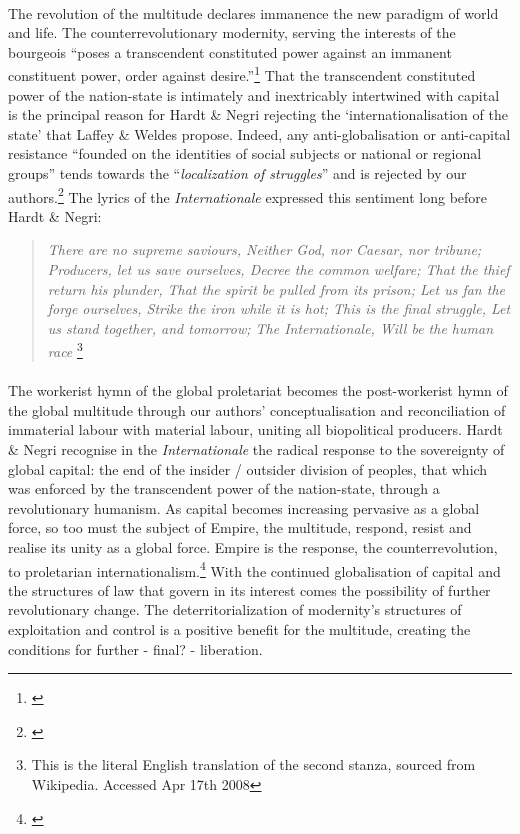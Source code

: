 \documentclass[12pt,a4paper,titlepage]{article}
\begin{document}
\paragraph{}The revolution of the multitude declares immanence the new paradigm of world and life. The counterrevolutionary modernity, serving the interests of the bourgeois ``poses a transcendent constituted power against an immanent constituent power, order against desire.''\footnote{\cite[p. 74]{Hardt:2001jl}} That the transcendent constituted power of the nation-state is intimately and inextricably intertwined with capital is the principal reason for Hardt \& Negri rejecting the `internationalisation of the state' that Laffey \& Weldes propose. Indeed, any anti-globalisation or anti-capital resistance ``founded on the identities of social subjects or national or regional groups'' tends towards the ``\textit{localization of struggles}'' and is rejected by our authors.\footnote{\cite[p. 44, original emphasis]{Hardt:2001jl}} The lyrics of the \textit{Internationale} expressed this sentiment long before Hardt \& Negri:

\begin{quote}
\textit{There are no supreme saviours, Neither God, nor Caesar, nor tribune; Producers, let us save ourselves, Decree the common welfare; That the thief return his plunder, That the spirit be pulled from its prison; Let us fan the forge ourselves, Strike the iron while it is hot; This is the final struggle, Let us stand together, and tomorrow; The Internationale, Will be the human race} \footnote{This is the literal English translation of the second stanza, sourced from Wikipedia. Accessed Apr 17th 2008}
\end{quote}

\paragraph{}The workerist hymn of the global proletariat becomes the post-workerist hymn of the global multitude through our authors' conceptualisation and reconciliation of immaterial labour with material labour, uniting all biopolitical producers. Hardt \& Negri recognise in the \textit{Internationale} the radical response to the sovereignty of global capital: the end of the insider / outsider division of peoples, that which was enforced by the transcendent power of the nation-state, through a revolutionary humanism. As capital becomes increasing pervasive as a global force, so too must the subject of Empire, the multitude, respond, resist and realise its unity as a global force. Empire is the response, the counterrevolution, to proletarian internationalism.\footnote{\cite[p. 51]{Hardt:2001jl}} With the continued globalisation of capital and the structures of law that govern in its interest comes the possibility of further revolutionary change. The deterritorialization of modernity's structures of exploitation and control is a positive benefit for the multitude, creating the conditions for further - final? - liberation.
\end{document}
